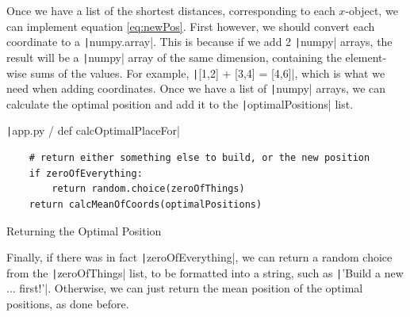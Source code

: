 \documentclass[12pt]{report}
\newcommand{\pil}[1]{\protect\texttt|#1|}
\begin{document}
Once we have a list of the shortest distances, corresponding to each $x$-object, we can implement equation \ref{eq:newPos}. First however, we should convert each coordinate to a \pil{numpy.array}. This is because if we add 2 \pil{numpy} arrays, the result will be a \pil{numpy} array of the same dimension, containing the element-wise sums of the values. For example, \pil{[1,2] + [3,4] = [4,6]}, which is what we need when adding coordinates. Once we have a list of \pil{numpy} arrays, we can calculate the optimal position and add it to the \pil{optimalPositions} list.

\begin{listing}[H]
\pil{app.py / def calcOptimalPlaceFor}
\begin{verbatim}
    # return either something else to build, or the new position
    if zeroOfEverything:
        return random.choice(zeroOfThings)
    return calcMeanOfCoords(optimalPositions)
\end{verbatim}
\caption{Returning the Optimal Position}\label{cs:returnOptimalPosition}
\end{listing}

Finally, if there was in fact \pil{zeroOfEverything}, we can return a random choice from the \pil{zeroOfThings} list, to be formatted into a string, such as \pil{'Build a new ... first!'}. Otherwise, we can just return the mean position of the optimal positions, as done before. 

\begin{center}
\end{center}
\end{document}
